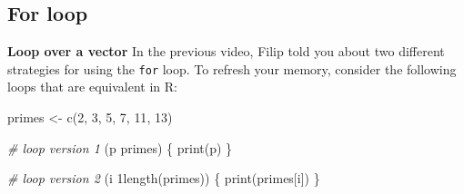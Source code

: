 \documentclass[]{article}
\newcommand{\hlnum}[1]{\textcolor[rgb]{0.816,0.125,0.439}{#1}}%
\newcommand{\hlstr}[1]{\textcolor[rgb]{0.251,0.627,0.251}{#1}}%
\newcommand{\hlcom}[1]{\textcolor[rgb]{0.502,0.502,0.502}{\textit{#1}}}%
\newcommand{\hlstd}[1]{\textcolor[rgb]{0.251,0.251,0.251}{#1}}%
\newcommand{\hlkwd}[1]{\textcolor[rgb]{0.878,0.439,0.125}{#1}}%
\newenvironment{Shaded}{\begin{myshaded}}{\end{myshaded}}
\newcommand{\KeywordTok}[1]{\hlkwd{#1}}
\newcommand{\DecValTok}[1]{\hlnum{#1}}
\newcommand{\StringTok}[1]{\hlstr{#1}}
\newcommand{\CommentTok}[1]{\hlcom{#1}}
\newcommand{\NormalTok}[1]{\hlstd{#1}}
\begin{document}
\begin{Shaded}
\end{Shaded}

\subsection{For loop}\label{for-loop}

\textbf{Loop over a vector} In the previous video, Filip told you about
two different strategies for using the \texttt{for} loop. To refresh
your memory, consider the following loops that are equivalent in R:

\begin{Shaded}
\begin{Highlighting}[]
\NormalTok{primes <-}\StringTok{ }\KeywordTok{c}\NormalTok{(}\DecValTok{2}\NormalTok{, }\DecValTok{3}\NormalTok{, }\DecValTok{5}\NormalTok{, }\DecValTok{7}\NormalTok{, }\DecValTok{11}\NormalTok{, }\DecValTok{13}\NormalTok{)}

\CommentTok{# loop version 1}
\NormalTok{ (p }\NormalTok{ primes) \{}
\KeywordTok{print}\NormalTok{(p)}
\NormalTok{\}}

\CommentTok{# loop version 2}
\NormalTok{ (i } \DecValTok{1}\OperatorTok{:}\KeywordTok{length}\NormalTok{(primes)) \{}
\KeywordTok{print}\NormalTok{(primes[i])}
\NormalTok{\}}
\end{Highlighting}
\end{Shaded}
\end{document}
